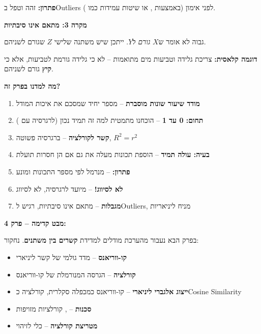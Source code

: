 \textbf{פתרון:} זהה וטפל ב\en{-}Outliers לפני אימון (באמצעות , או שיטות עמידות כמו ).

\textbf{מקרה \num{3}: מתאם אינו סיבתיות}

\Rsquared{} גבוה לא אומר ש\en{-}$X$ \textit{גורם} ל\en{-}$Y$. ייתכן שיש משתנה שלישי $Z$ שגורם לשניהם.

\textbf{דוגמה קלאסית:} צריכת גלידה וטביעות מים מתואמות – לא כי גלידה גורמת לטביעות, אלא כי \textbf{קיץ} גורם לשניהם.


\textbf{מה למדנו בפרק זה?}

\begin{enumerate}
\item \textbf{\Rsquared{} מודד שיעור שונות מוסברת} – מספר יחיד שמסכם את איכות המודל
\item \textbf{תחום: \num{0} עד \num{1}} – הוכחנו מתמטית למה זה תמיד נכון (לרגרסיה עם )
\item \textbf{קשר לקורלציה} – ברגרסיה פשוטה, $R^2 = r^2$
\item \textbf{בעיה: עולה תמיד} – הוספת תכונות מעלה את \Rsquared{} גם אם הן חסרות תועלת
\item \textbf{פתרון: } – מנרמל לפי מספר התכונות ומונע 
\item \textbf{לא לסיווג!} – \Rsquared{} מיועד לרגרסיה, לא לסיווג
\item \textbf{מגבלות} – מתאם אינו סיבתיות, רגיש ל\en{-}Outliers, מניח ליניאריות
\end{enumerate}

\textbf{מבט קדימה – פרק \num{4}:}

בפרק הבא נעבור מהערכת מודלים למדידת \textbf{קשרים בין משתנים}. נחקור:

\begin{itemize}
\item \textbf{קו-ווריאנס}  – מדד גולמי של קשר ליניארי
\item \textbf{קורלציה}  – הגרסה המנורמלת של קו-ווריאנס
\item \textbf{ייצוג אלגברי ליניארי} – קו-ווריאנס כמכפלה סקלרית, קורלציה כ\en{-}Cosine Similarity
\item \textbf{סכנות} – , קורלציות מזויפות
\item \textbf{מטריצת קורלציה} – כלי לזיהוי 
\end{itemize}

